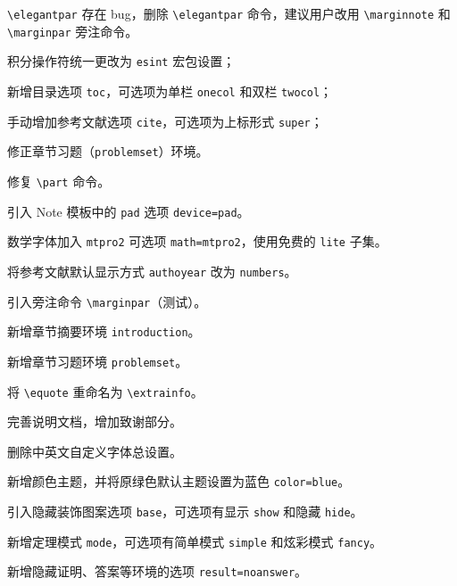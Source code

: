 \documentclass[cn,10pt,math=newtx,citestyle=gb7714-2015,bibstyle=gb7714-2015]{elegantbook}
\begin{document}
\begin{change}
  \item \lstinline{\elegantpar} 存在 bug，删除 \lstinline{\elegantpar} 命令，建议用户改用 \lstinline{\marginnote} 和 \lstinline{\marginpar} 旁注命令。
  \item 积分操作符统一更改为 \lstinline{esint} 宏包设置；
  \item 新增目录选项 \lstinline{toc}，可选项为单栏 \lstinline{onecol} 和双栏 \lstinline{twocol}；
  \item 手动增加参考文献选项 \lstinline{cite}，可选项为上标形式 \lstinline{super}；
  \item 修正章节习题（\lstinline{problemset}）环境。
\end{change}


\begin{change}
  \item 修复 \lstinline{\part} 命令。
  \item 引入 Note 模板中的 \lstinline{pad} 选项 \lstinline{device=pad}。
  \item 数学字体加入 \lstinline{mtpro2} 可选项 \lstinline{math=mtpro2}，使用免费的 \lstinline{lite} 子集。
  \item 将参考文献默认显示方式 \lstinline{authoyear} 改为 \lstinline{numbers}。
  \item 引入旁注命令 \lstinline{\marginpar}（测试）。
  \item 新增章节摘要环境 \lstinline{introduction}。
  \item 新增章节习题环境 \lstinline{problemset}。
  \item 将 \lstinline{\equote} 重命名为 \lstinline{\extrainfo}。
  \item 完善说明文档，增加致谢部分。
\end{change}


\begin{change}
  \item 删除中英文自定义字体总设置。
  \item 新增颜色主题，并将原绿色默认主题设置为蓝色 \lstinline{color=blue}。
  \item 引入隐藏装饰图案选项 \lstinline{base}，可选项有显示 \lstinline{show} 和隐藏 \lstinline{hide}。
  \item 新增定理模式 \lstinline{mode}，可选项有简单模式 \lstinline{simple} 和炫彩模式 \lstinline{fancy}。
  \item 新增隐藏证明、答案等环境的选项 \lstinline{result=noanswer}。
\end{change}
\end{document}
